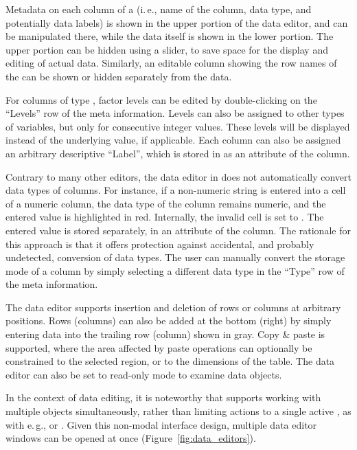 Metadata on each column of a  (i.\,e., name of the column, data
type, and potentially data labels) is shown in the upper portion of
the data editor, and can be manipulated there, while the data itself is
shown in the lower portion. The upper portion can be hidden using a
slider, to save space for the display and editing of actual data.
Similarly, an editable column showing the row names of the 
can be shown or hidden separately from the data.

For columns of type , factor levels can be edited by double-clicking on the
``Levels'' row of the meta information. Levels can also be assigned to other types of
variables, but only for consecutive integer values. These levels will
be displayed instead of the underlying value, if applicable. Each
column can also be assigned an arbitrary descriptive
``Label'', which is stored in
 as an attribute of the column.

Contrary to many other editors, the data editor in  does not
automatically convert data types of columns. For instance, if a
non-numeric string is entered into a cell of a numeric column, the data
type of the column remains numeric, and the entered value is
highlighted in red. Internally, the invalid cell is set to .
The entered value is stored separately, in an attribute of the column.
The rationale for this approach is that it offers protection against
accidental, and probably undetected, conversion of data types. The
user can manually convert the storage mode of a column by simply
selecting a different data type in the ``Type'' row of the meta information.

The data editor supports insertion and deletion of rows or columns at 
arbitrary positions. Rows (columns) can also be added at the bottom 
(right) by simply entering data into the trailing row (column) shown in
gray. Copy \& paste is supported, where the area affected by paste
operations can optionally be constrained to the selected region, or to
the dimensions of the table. The data editor can also be set to read-only
mode to examine data objects.

In the context of data editing, it is noteworthy that
 supports working with multiple objects simultaneously, rather than
limiting actions to a single active , as with e.\,g.,  or
. Given this non-modal interface design, multiple data editor
windows can be opened at once (Figure~\ref{fig:data_editors}).

